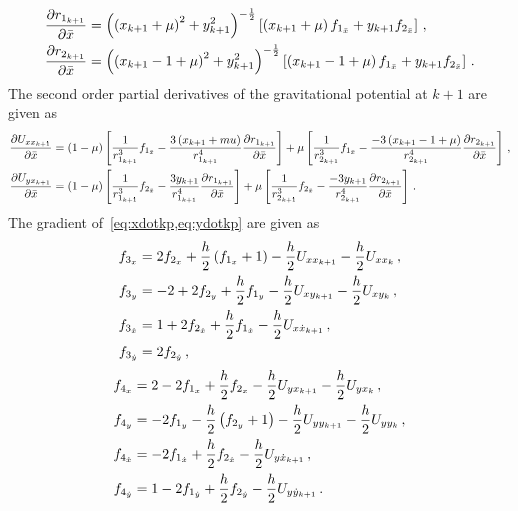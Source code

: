 \documentclass[preprint]{elsarticle}
\begin{document}
\begin{subequations}\label{eq:distkp_grad}
\begin{align}
	\frac{\partial r_{1_{k+1}}}{\partial \bar{x}} &= \left( \left( x_{k+1} + \mu\right)^2 + y_{k+1}^2 \right)^{-\frac{1}{2}} \left[ \left( x_{k+1} + \mu \right) f_{1_{\bar{x}}} + y_{k+1} f_{2_{\bar{x}}} \right] \, ,\\
	\frac{\partial r_{2_{k+1}}}{\partial \bar{x}} &= \left( \left( x_{k+1} - 1 + \mu\right)^2 + y_{k+1}^2 \right)^{-\frac{1}{2}} \left[ \left( x_{k+1} -1 + \mu \right) f_{1_{\bar{x}}} + y_{k+1} f_{2_{\bar{x}}} \right]  \, .
\end{align}
\end{subequations}
The second order partial derivatives of the gravitational potential at \( k+1\) are given as
\begin{subequations}
\begin{align}
	\frac{\partial U_{xx_{k+1}}}{\partial \bar{x}} &= \left( 1-\mu \right)\left[ \frac{1}{r_{1_{k+1}}^3} f_{1_{\bar{x}}} - \frac{3 \left( x_{k+1} +mu \right)}{r_{1_{k+1}}^4} \frac{\partial r_{1_{k+1}}}{\partial \bar{x}} \right] + \mu \left[ \frac{1}{r_{2_{k+1}}^3} f_{1_{\bar{x}}} - \frac{-3 \left( x_{k+1} -1 + \mu \right)}{r_{2_{k+1}}^4} \frac{\partial r_{2_{k+1}}}{\partial \bar{x}} \right] \, ,\\
	\frac{\partial U_{yx_{k+1}}}{\partial \bar{x}} &= \left( 1-\mu \right)\left[ \frac{1}{r_{1_{k+1}}^3} f_{2_{\bar{x}}} - \frac{3 y_{k+1}}{r_{1_{k+1}}^4} \frac{\partial r_{1_{k+1}}}{\partial \bar{x}} \right] + \mu \left[ \frac{1}{r_{2_{k+1}}^3} f_{2_{\bar{x}}} - \frac{-3 y_{k+1}}{r_{2_{k+1}}^4} \frac{\partial r_{2_{k+1}}}{\partial \bar{x}} \right] \, .
\end{align}
\end{subequations}
The gradient of~\cref{eq:xdotkp,eq:ydotkp} are given as
\begin{subequations}\label{eq:xdotkp_grad}
\begin{align}
	f_{3_x} &= 2 f_{2_x} + \frac{h}{2} \left( f_{1_x} + 1 \right) - \frac{h}{2} U_{xx_{k+1}} - \frac{h}{2} U_{xx_k} \, ,\\
	f_{3_y} &= -2 + 2 f_{2_y} + \frac{h}{2} f_{1_y} - \frac{h}{2} U_{xy_{k+1}} -\frac{h}{2} U_{xy_{k}} \, ,\\
	f_{3_{\dot{x}}} &= 1 + 2 f_{2_{\dot{x}}} + \frac{h}{2} f_{1_{\dot{x}}} - \frac{h}{2} U_{x\dot{x}_{k+1}}\, ,\\
	f_{3_{\dot{y}}} &= 2 f_{2_{\dot{y}}}\, ,
\end{align}
\end{subequations}
\begin{subequations}\label{eq:ydotkp_grad}
\begin{align}
	f_{4_x} &= 2 - 2 f_{1_x} + \frac{h}{2} f_{2_x}  - \frac{h}{2} U_{yx_{k+1}} - \frac{h}{2} U_{yx_k} \, ,\\
	f_{4_y} &= -2f_{1_y}  - \frac{h}{2} \left( f_{2_y} + 1 \right) - \frac{h}{2} U_{yy_{k+1}} -\frac{h}{2} U_{yy_{k}} \, ,\\
	f_{4_{\dot{x}}} &= - 2 f_{1_{\dot{x}}} +  \frac{h}{2} f_{2_{\dot{x}}} - \frac{h}{2} U_{y\dot{x}_{k+1}}\, ,\\
	f_{4_{\dot{y}}} &= 1 - 2 f_{1_{\dot{y}}} + \frac{h}{2} f_{2_{\dot{y}}} - \frac{h}{2} U_{y\dot{y}_{k+1}}\, .
\end{align}
\end{subequations}
\end{document}
